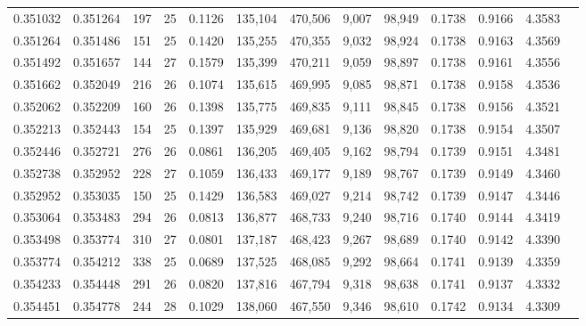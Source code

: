 \begin{tabular}{rrrrrrrrrrrrr}
0.351032 & 0.351264 & 197 &  25 &                                     0.1126 & 135,104 & 470,506 &   9,007 &  98,949 & 0.1738 & 0.9166 & 4.3583 \\
0.351264 & 0.351486 & 151 &  25 &                                     0.1420 & 135,255 & 470,355 &   9,032 &  98,924 & 0.1738 & 0.9163 & 4.3569 \\
0.351492 & 0.351657 & 144 &  27 &                                     0.1579 & 135,399 & 470,211 &   9,059 &  98,897 & 0.1738 & 0.9161 & 4.3556 \\
0.351662 & 0.352049 & 216 &  26 &                                     0.1074 & 135,615 & 469,995 &   9,085 &  98,871 & 0.1738 & 0.9158 & 4.3536 \\
0.352062 & 0.352209 & 160 &  26 &                                     0.1398 & 135,775 & 469,835 &   9,111 &  98,845 & 0.1738 & 0.9156 & 4.3521 \\
0.352213 & 0.352443 & 154 &  25 &                                     0.1397 & 135,929 & 469,681 &   9,136 &  98,820 & 0.1738 & 0.9154 & 4.3507 \\
0.352446 & 0.352721 & 276 &  26 &                                     0.0861 & 136,205 & 469,405 &   9,162 &  98,794 & 0.1739 & 0.9151 & 4.3481 \\
0.352738 & 0.352952 & 228 &  27 &                                     0.1059 & 136,433 & 469,177 &   9,189 &  98,767 & 0.1739 & 0.9149 & 4.3460 \\
0.352952 & 0.353035 & 150 &  25 &                                     0.1429 & 136,583 & 469,027 &   9,214 &  98,742 & 0.1739 & 0.9147 & 4.3446 \\
0.353064 & 0.353483 & 294 &  26 &                                     0.0813 & 136,877 & 468,733 &   9,240 &  98,716 & 0.1740 & 0.9144 & 4.3419 \\
0.353498 & 0.353774 & 310 &  27 &                                     0.0801 & 137,187 & 468,423 &   9,267 &  98,689 & 0.1740 & 0.9142 & 4.3390 \\
0.353774 & 0.354212 & 338 &  25 &                                     0.0689 & 137,525 & 468,085 &   9,292 &  98,664 & 0.1741 & 0.9139 & 4.3359 \\
0.354233 & 0.354448 & 291 &  26 &                                     0.0820 & 137,816 & 467,794 &   9,318 &  98,638 & 0.1741 & 0.9137 & 4.3332 \\
0.354451 & 0.354778 & 244 &  28 &                                     0.1029 & 138,060 & 467,550 &   9,346 &  98,610 & 0.1742 & 0.9134 & 4.3309 \\

\end{tabular}
